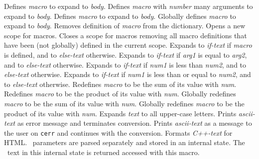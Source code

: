 \documentclass[11pt]{article}
\begin{document}
\begin{description}
    Defines {\em macro\/} to expand to {\em body}.
    Defines {\em macro\/} with {\em number\/} many arguments to expand to
    {\em body}.
    Defines {\em macro\/} to expand to {\em body}.
    Globally defines {\em macro\/} to expand to {\em body}.
    Removes definition of {\em macro\/} from the dictionary.
    Opens a new scope for macros.
    Closes a scope for macros removing all macro definitions that 
    have been (not globally) defined in the current scope.
    Expands to {\em if-text\/} if {\em macro\/} is defined, and to
    {\em else-text\/} otherwise.
    Expands to {\em if-text\/} if {\em arg1\/} is equal to {\em arg2}, and to
    {\em else-text\/} otherwise.
    Expands to {\em if-text\/} if {\em num1\/} is less than {\em num2}, and to
    {\em else-text\/} otherwise.
    Expands to {\em if-text\/} if {\em num1\/} is less than or equal 
    to {\em num2}, and to {\em else-text\/} otherwise.
    Redefines {\em macro\/} to be the sum of its value with {\em num}.
    Redefines {\em macro\/} to be the product of its value with {\em num}.
    Globally redefines {\em macro\/} to be the sum of its value with {\em num}.
    Globally redefines {\em macro\/} to be the product of its value 
    with {\em num}.
    Expands {\em text\/} to all upper-case letters.
    Prints {\em ascii-text\/} as error message and terminates conversion.
    Prints {\em ascii-text\/} as a message to the user on {\tt cerr}
    and continues with the conversion.
    Formats {\em C++-text} for HTML.
    \CC\ parameters are parsed separately and stored in an internal state.
    The \CC\ text in this internal state is returned accessed with this macro.

\end{description}
\end{document}
